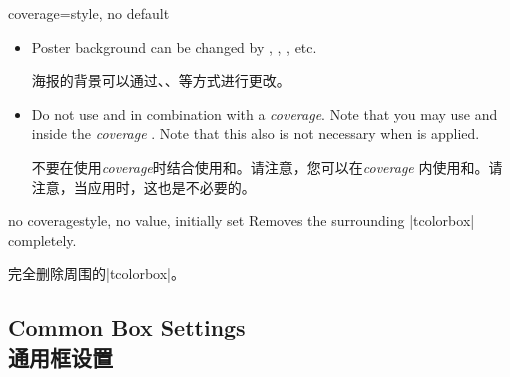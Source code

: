 \begin{postersetTcbKey}[][doc new=2017-07-03]{coverage}{=}{style, no default}
\begin{itemize}
海报边距可以通过 ，，， 调整。
\item Poster background can be changed by ,
, , etc.

海报的背景可以通过、、等方式进行更改。
\item Do not use  and 
  in combination with a \emph{coverage}. Note that you may use
   and  inside
  the \emph{coverage} . Note that this also is not
  necessary when  is applied.

不要在使用\emph{coverage}时结合使用和。请注意，您可以在\emph{coverage} 内使用和。请注意，当应用时，这也是不必要的。
\end{itemize}
\end{postersetTcbKey}


\begin{postersetTcbKey}[][doc new=2017-07-03]{no coverage}{}{style, no value, initially set}
Removes the surrounding |tcolorbox| completely.

完全删除周围的|tcolorbox|。
\end{postersetTcbKey}

%
\subsection{Common Box Settings\\通用框设置}\label{subsec:poster_boxsettings}


